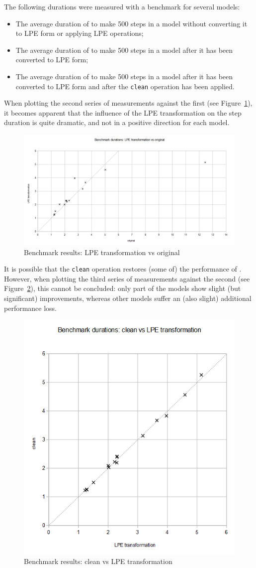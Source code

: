 The following durations were measured with a benchmark for several models:
\begin{itemize}
\item The average duration of \txs{} to make 500 steps in a model without converting it to LPE form or applying LPE operations;
\item The average duration of \txs{} to make 500 steps in a model after it has been converted to LPE form;
\item The average duration of \txs{} to make 500 steps in a model after it has been converted to LPE form and after the \texttt{clean} operation has been applied.
\end{itemize}

When plotting the second series of measurements against the first (see Figure~\ref{lpe-only-vs-original:fig}), it becomes apparent that the influence of the LPE transformation on the step duration is quite dramatic, and not in a positive direction for each model.

\begin{figure}[!ht]
\begin{center}
\includegraphics[width=0.8\linewidth]{charts/lpe-only-vs-original}
\caption{Benchmark results: LPE transformation vs original}
\label{lpe-only-vs-original:fig}
\end{center}
\end{figure}

It is possible that the \texttt{clean} operation restores (some of) the performance of \txs{}.
However, when plotting the third series of measurements against the second (see Figure~\ref{clean-vs-lpe-only:fig}), this cannot be concluded: only part of the models show slight (but significant) improvements, whereas other models suffer an (also slight) additional performance loss.

\begin{figure}[!ht]
\begin{center}
\includegraphics[width=0.5\linewidth]{charts/clean-vs-lpe-only}
\caption{Benchmark results: clean vs LPE transformation}
\label{clean-vs-lpe-only:fig}
\end{center}
\end{figure}



